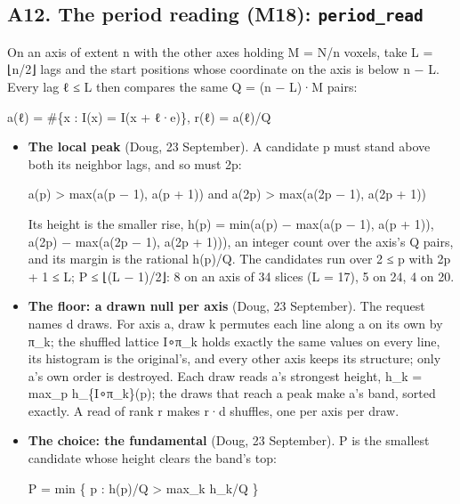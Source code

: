 \subsection{\texorpdfstring{A12. The period reading (M18): \texttt{period\_\allowbreak{}read}}{A12. The period reading (M18): period\_read}}

On an axis of extent n with the other axes holding M = N/n voxels, take L = ⌊n/2⌋ lags and the start positions whose coordinate on the axis is below n − L. Every lag ℓ ≤ L then compares the same Q = (n − L)·M pairs:

a(ℓ) = \#\{x : I(x) = I(x + ℓ·e)\},  r(ℓ) = a(ℓ)/Q

\begin{itemize}
\item \textbf{The local peak} (Doug, 23 September). A candidate p must stand above both its neighbor lags, and so must 2p:

a(p) > max(a(p − 1), a(p + 1))  and  a(2p) > max(a(2p − 1), a(2p + 1))

Its height is the smaller rise, h(p) = min(a(p) − max(a(p − 1), a(p + 1)), a(2p) − max(a(2p − 1), a(2p + 1))), an integer count over the axis's Q pairs, and its margin is the rational h(p)/Q. The candidates run over 2 ≤ p with 2p + 1 ≤ L; P ≤ ⌊(L − 1)/2⌋: 8 on an axis of 34 slices (L = 17), 5 on 24, 4 on 20.
\item \textbf{The floor: a drawn null per axis} (Doug, 23 September). The request names d draws. For axis a, draw k permutes each line along a on its own by π\_\allowbreak{}k; the shuffled lattice I∘π\_\allowbreak{}k holds exactly the same values on every line, its histogram is the original's, and every other axis keeps its structure; only a's own order is destroyed. Each draw reads a's strongest height, h\_\allowbreak{}k = max\_\allowbreak{}p h\_\allowbreak{}\{I∘π\_\allowbreak{}k\}(p); the draws that reach a peak make a's band, sorted exactly. A read of rank r makes r·d shuffles, one per axis per draw.
\item \textbf{The choice: the fundamental} (Doug, 23 September). P is the smallest candidate whose height clears the band's top:

P = min \{ p : h(p)/Q > max\_\allowbreak{}k h\_\allowbreak{}k/Q \}


\end{itemize}
